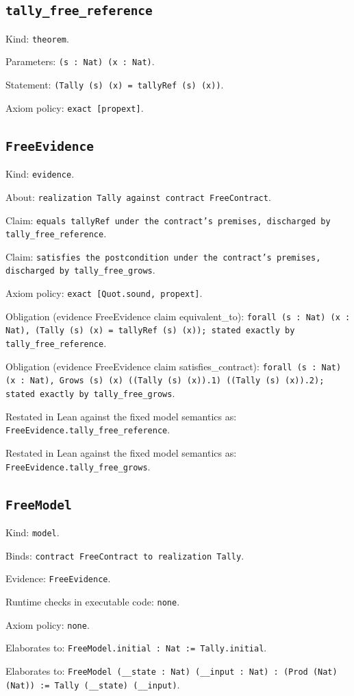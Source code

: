 \documentclass[11pt]{article}
\begin{document}
\subsection*{\texttt{tally\_free\_reference}}
\noindent Kind: \texttt{theorem}.\par
\noindent Parameters: \texttt{(s : Nat) (x : Nat)}.\par
\noindent Statement: \texttt{(Tally (s) (x) = tallyRef (s) (x))}.\par
\noindent Axiom policy: \texttt{exact [propext]}.\par
\subsection*{\texttt{FreeEvidence}}
\noindent Kind: \texttt{evidence}.\par
\noindent About: \texttt{realization Tally against contract FreeContract}.\par
\noindent Claim: \texttt{equals tallyRef under the contract's premises, discharged by tally\_free\_reference}.\par
\noindent Claim: \texttt{satisfies the postcondition under the contract's premises, discharged by tally\_free\_grows}.\par
\noindent Axiom policy: \texttt{exact [Quot.sound, propext]}.\par
\noindent Obligation (evidence FreeEvidence claim equivalent\_to): \texttt{forall (s : Nat) (x : Nat), (Tally (s) (x) = tallyRef (s) (x)); stated exactly by tally\_free\_reference}.\par
\noindent Obligation (evidence FreeEvidence claim satisfies\_contract): \texttt{forall (s : Nat) (x : Nat), Grows (s) (x) ((Tally (s) (x)).1) ((Tally (s) (x)).2); stated exactly by tally\_free\_grows}.\par
\noindent Restated in Lean against the fixed model semantics as: \texttt{FreeEvidence.tally\_free\_reference}.\par
\noindent Restated in Lean against the fixed model semantics as: \texttt{FreeEvidence.tally\_free\_grows}.\par
\subsection*{\texttt{FreeModel}}
\noindent Kind: \texttt{model}.\par
\noindent Binds: \texttt{contract FreeContract to realization Tally}.\par
\noindent Evidence: \texttt{FreeEvidence}.\par
\noindent Runtime checks in executable code: \texttt{none}.\par
\noindent Axiom policy: \texttt{none}.\par
\noindent Elaborates to: \texttt{FreeModel.initial : Nat := Tally.initial}.\par
\noindent Elaborates to: \texttt{FreeModel (\_\_state : Nat) (\_\_input : Nat) : (Prod (Nat) (Nat)) := Tally (\_\_state) (\_\_input)}.\par
\end{document}
